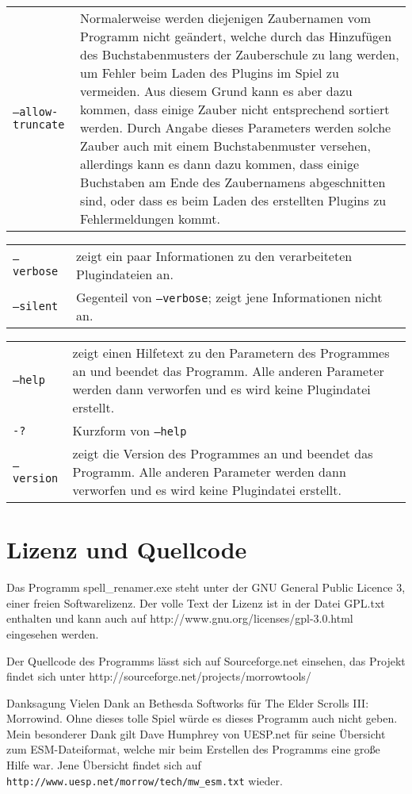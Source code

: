 \documentclass[12pt,oneside,a4paper]{article}
\begin{document}
\begin{tabular}{p{7cm} p{8cm}}
\texttt{--allow-truncate}         & Normalerweise werden diejenigen Zaubernamen vom Programm nicht ge\"{a}ndert, welche durch das Hinzuf\"{u}gen des Buchstabenmusters der Zauberschule zu lang werden, um Fehler beim Laden des Plugins im Spiel zu vermeiden. Aus diesem Grund kann es aber dazu kommen, dass einige Zauber nicht entsprechend sortiert werden. Durch Angabe dieses Parameters werden solche Zauber auch mit einem Buchstabenmuster versehen, allerdings kann es dann dazu kommen, dass einige Buchstaben am Ende des Zaubernamens abgeschnitten sind, oder dass es beim Laden des erstellten Plugins zu Fehlermeldungen kommt.\\
\end{tabular}
\newline
\begin{tabular}{p{7cm} p{8cm}}
\texttt{--verbose}                & zeigt ein paar Informationen zu den verarbeiteten Plugindateien an.\\
\texttt{--silent}                 & Gegenteil von \texttt{--verbose}; zeigt jene Informationen nicht an.\\
\end{tabular}
\newline
\begin{tabular}{p{7cm} p{8cm}}
\texttt{--help}                   & zeigt einen Hilfetext zu den Parametern des Programmes an und beendet das Programm. Alle anderen Parameter werden dann verworfen und es wird keine Plugindatei erstellt.\\
\texttt{-?}                       & Kurzform von \texttt{--help}\\
\texttt{--version}                & zeigt die Version des Programmes an und beendet das Programm. Alle anderen Parameter werden dann verworfen und es wird keine Plugindatei erstellt.\\
\end{tabular}

\section{Lizenz und Quellcode}
Das Programm spell\_renamer.exe steht unter der GNU General Public Licence 3,
einer freien Softwarelizenz. Der volle Text der Lizenz ist in der Datei GPL.txt
enthalten und kann auch auf http://www.gnu.org/licenses\slash gpl-3.0.html eingesehen werden.

Der Quellcode des Programms l\"{a}sst sich auf Sourceforge.net einsehen, das Projekt
findet sich unter http://sourceforge.net/projects/morrowtools/

\begin{section}{Danksagung}
Vielen Dank an Bethesda Softworks f\"{u}r The Elder Scrolls III: Morrowind.
Ohne dieses tolle Spiel w\"{u}rde es dieses Programm auch nicht geben.\\
Mein besonderer Dank gilt Dave Humphrey von UESP.net f\"{u}r seine \"{U}bersicht
zum ESM-Dateiformat, welche mir beim Erstellen des Programms eine gro\ss{}e
Hilfe war. Jene \"{U}bersicht findet sich auf \texttt{http://www.uesp.net/morrow\slash tech/mw\_esm.txt}
wieder.
\end{section}
\end{document}
